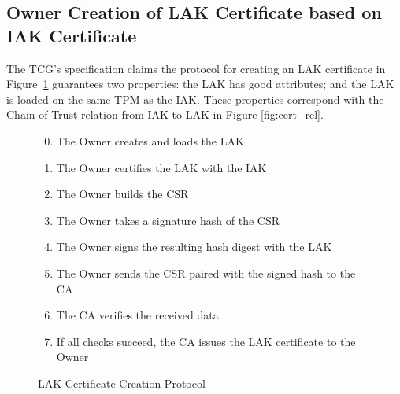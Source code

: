 \documentclass[runningheads]{llncs}
\begin{document}
\subsection{Owner Creation of LAK Certificate based on IAK Certificate}

The TCG's specification claims the protocol for creating an LAK
certificate in Figure~\ref{fig:lak-certificate-creation} guarantees two
properties: the LAK has good attributes; and the LAK is loaded on the
same TPM as the IAK. These properties correspond with the Chain of
Trust relation from IAK to LAK in Figure \ref{fig:cert_rel}.

\begin{figure}[hpbt]
  \vspace{-\medskipamount}
  \vspace{-\medskipamount}

  \begin{enumerate}[itemsep=0pt,parsep=0pt,partopsep=0pt]
  \setcounter{enumi}{-1}
  \item The Owner creates and loads the LAK
  \item The Owner certifies the LAK with the IAK
  \item The Owner builds the CSR%
  \item The Owner takes a signature hash of the CSR
  \item The Owner signs the resulting hash digest with the LAK
  \item The Owner sends the CSR paired with the signed hash to the CA
  \item The CA verifies the received data%
  \item If all checks succeed, the CA issues the LAK certificate to the Owner
  \end{enumerate}
  \caption{LAK Certificate Creation Protocol}
  \label{fig:lak-certificate-creation}
\end{figure}
\end{document}
